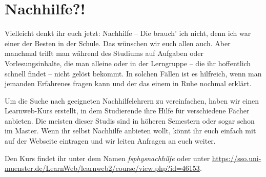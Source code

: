 \section{Nachhilfe?!}
\begin{multicols}{2}
Vielleicht denkt ihr euch jetzt: Nachhilfe -- Die brauch' ich nicht, denn ich war einer der Besten in der Schule. Das wünschen wir euch allen auch. Aber manchmal trifft man während des Studiums auf Aufgaben oder Vorlesungsinhalte, die man alleine oder in der Lerngruppe -- die ihr hoffentlich schnell findet -- nicht gelöst bekommt. In solchen Fällen ist es hilfreich, wenn man jemanden Erfahrenes fragen kann und der das einem in Ruhe nochmal erklärt.

Um die Suche nach geeigneten Nachhilfelehrern zu vereinfachen, haben wir einen Learnweb-Kurs erstellt, in dem Studierende ihre Hilfe für verschiedene Fächer anbieten. Die meisten dieser Studis sind in höheren Semestern oder sogar schon im Master. Wenn ihr selbst Nachhilfe  anbieten wollt, könnt ihr euch einfach mit auf der Webseite eintragen und wir leiten Anfragen an euch weiter.

Den Kurs findet ihr unter dem Namen \textit{fsphysnachhilfe} oder unter \url{https://sso.uni-muenster.de/LearnWeb/learnweb2/course/view.php?id=46153}.

\end{multicols}
